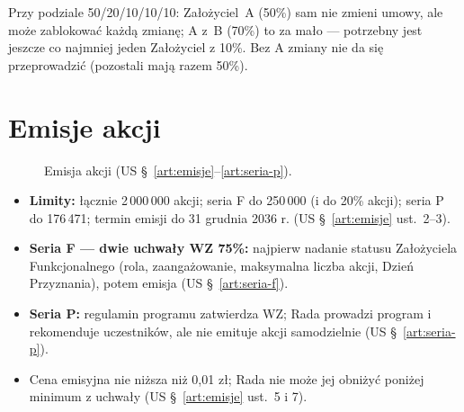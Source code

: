 \documentclass[11pt,a4paper]{report}
\begin{document}
\begin{Komentarz}
Przy podziale 50/20/10/10/10: Założyciel~A (50\%) sam nie zmieni umowy, ale może zablokować każdą zmianę; A z~B (70\%) to za mało --- potrzebny jest jeszcze co najmniej jeden Założyciel z 10\%. Bez A zmiany nie da się przeprowadzić (pozostali mają razem 50\%).
\end{Komentarz}

\section{Emisje akcji}

\begin{figure}[H]
\centering
{}
\caption{Emisja akcji (US §~\ref{art:emisje}--\ref{art:seria-p}).}
\end{figure}

\begin{itemize}
  \item \textbf{Limity:} łącznie 2\,000\,000 akcji; seria F do 250\,000 (i do 20\% akcji); seria P do 176\,471; termin emisji do 31 grudnia 2036 r. (US §~\ref{art:emisje} ust.~2--3).
  \item \textbf{Seria F --- dwie uchwały WZ 75\%:} najpierw nadanie statusu Założyciela Funkcjonalnego (rola, zaangażowanie, maksymalna liczba akcji, Dzień Przyznania), potem emisja (US §~\ref{art:seria-f}).
  \item \textbf{Seria P:} regulamin programu zatwierdza WZ; Rada prowadzi program i rekomenduje uczestników, ale nie emituje akcji samodzielnie (US §~\ref{art:seria-p}).
  \item Cena emisyjna nie niższa niż 0,01 zł; Rada nie może jej obniżyć poniżej minimum z uchwały (US §~\ref{art:emisje} ust.~5 i 7).
\end{itemize}
\end{document}
